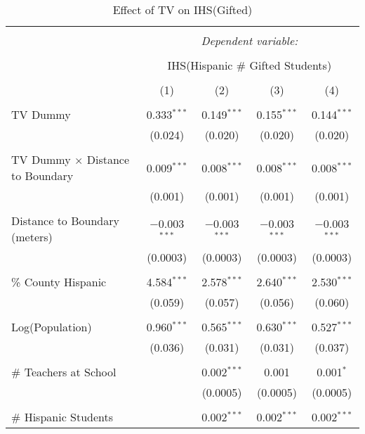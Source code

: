 
\begin{table}[!htbp] \centering 
  \caption{Effect of TV on IHS(Gifted)} 
  \label{} 
\begin{tabular}{@{\extracolsep{-2pt}}lcccc} 
\\[-1.8ex]\hline 
\hline \\[-1.8ex] 
 & \multicolumn{4}{c}{\textit{Dependent variable:}} \\ 
\cline{2-5} 
\\[-1.8ex] & \multicolumn{4}{c}{IHS(Hispanic \# Gifted Students)} \\ 
\\[-1.8ex] & (1) & (2) & (3) & (4)\\ 
\hline \\[-1.8ex] 
 TV Dummy & 0.333$^{***}$ & 0.149$^{***}$ & 0.155$^{***}$ & 0.144$^{***}$ \\ 
  & (0.024) & (0.020) & (0.020) & (0.020) \\ 
  & & & & \\ 
 TV Dummy $\times$ Distance to Boundary & 0.009$^{***}$ & 0.008$^{***}$ & 0.008$^{***}$ & 0.008$^{***}$ \\ 
  & (0.001) & (0.001) & (0.001) & (0.001) \\ 
  & & & & \\ 
 Distance to Boundary (meters) & $-$0.003$^{***}$ & $-$0.003$^{***}$ & $-$0.003$^{***}$ & $-$0.003$^{***}$ \\ 
  & (0.0003) & (0.0003) & (0.0003) & (0.0003) \\ 
  & & & & \\ 
 \% County Hispanic & 4.584$^{***}$ & 2.578$^{***}$ & 2.640$^{***}$ & 2.530$^{***}$ \\ 
  & (0.059) & (0.057) & (0.056) & (0.060) \\ 
  & & & & \\ 
 Log(Population) & 0.960$^{***}$ & 0.565$^{***}$ & 0.630$^{***}$ & 0.527$^{***}$ \\ 
  & (0.036) & (0.031) & (0.031) & (0.037) \\ 
  & & & & \\ 
 \# Teachers at School &  & 0.002$^{***}$ & 0.001 & 0.001$^{*}$ \\ 
  &  & (0.0005) & (0.0005) & (0.0005) \\ 
  & & & & \\ 
 \# Hispanic Students &  & 0.002$^{***}$ & 0.002$^{***}$ & 0.002$^{***}$ \\ 

\end{tabular}
\end{table}
